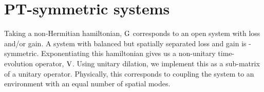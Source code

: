 \section{PT-symmetric systems}
\label{sec:PT}
Taking a non-Hermitian hamiltonian, \(\mathrm{G}\) corresponds to an open system
with loss and/or gain. A system with balanced but spatially separated loss and
gain is \pt-symmetric. Exponentiating this hamiltonian gives us a non-unitary
time-evolution operator, \(\mathrm{V}\). Using unitary dilation, we implement this
as a sub-matrix of a unitary operator. Physically, this corresponds to coupling
the system to an environment with an equal number of spatial modes.
